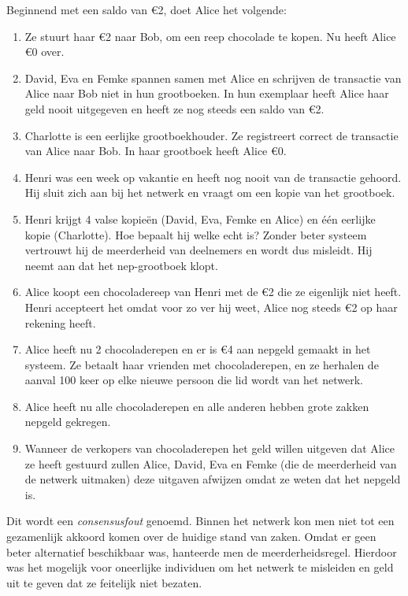Beginnend met een saldo van €2, doet Alice het volgende:

\begin{enumerate}
    \item Ze stuurt haar €2 naar Bob, om een reep chocolade te kopen. Nu heeft Alice €0 over.
    \item David, Eva en Femke spannen samen met Alice en schrijven de transactie van Alice naar Bob niet in hun grootboeken. In hun exemplaar heeft Alice haar geld nooit uitgegeven en heeft ze nog steeds een saldo van €2.
    \item Charlotte is een eerlijke grootboekhouder. Ze registreert correct de transactie van Alice naar Bob. In haar grootboek heeft Alice €0.
    \item Henri was een week op vakantie en heeft nog nooit van de transactie gehoord. Hij sluit zich aan bij het netwerk en vraagt om een kopie van het grootboek.
    \item Henri krijgt 4 valse kopieën (David, Eva, Femke en Alice) en één eerlijke kopie (Charlotte). Hoe bepaalt hij welke echt is? Zonder beter systeem vertrouwt hij de meerderheid van deelnemers en wordt dus misleidt. Hij neemt aan dat het nep-grootboek klopt.
    \item Alice koopt een chocoladereep van Henri met de €2 die ze eigenlijk niet heeft. Henri accepteert het omdat voor zo ver hij weet, Alice nog steeds €2 op haar rekening heeft.
    \item Alice heeft nu 2 chocoladerepen en er is €4 aan nepgeld gemaakt in het systeem. Ze betaalt haar vrienden met chocoladerepen, en ze herhalen de aanval 100 keer op elke nieuwe persoon die lid wordt van het netwerk.
    \item Alice heeft nu alle chocoladerepen en alle anderen hebben grote zakken nepgeld gekregen.
    \item Wanneer de verkopers van chocoladerepen het geld willen uitgeven dat Alice ze heeft gestuurd zullen Alice, David, Eva en Femke (die de meerderheid van de netwerk uitmaken) deze uitgaven afwijzen omdat ze weten dat het nepgeld is.
\end{enumerate}

Dit wordt een \textit{consensusfout} genoemd. Binnen het netwerk kon men niet tot een gezamenlijk akkoord komen over de huidige stand van zaken. Omdat er geen beter alternatief beschikbaar was, hanteerde men de meerderheidsregel. Hierdoor was het mogelijk voor oneerlijke individuen om het netwerk te misleiden en geld uit te geven dat ze feitelijk niet bezaten.

